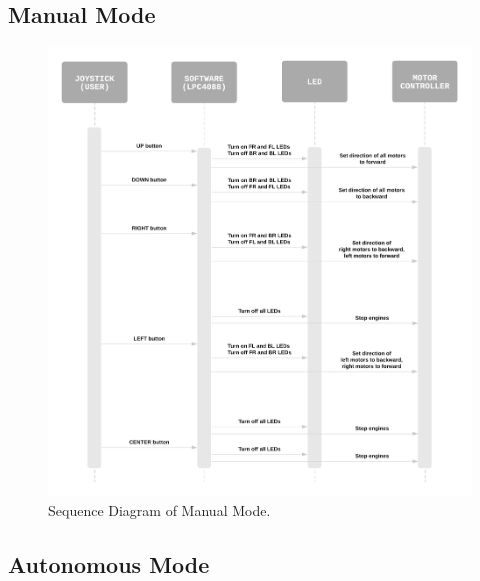 \documentclass[12pt]{article}
\begin{document}
\subsection{Manual Mode}
\FloatBarrier
\begin{figure}[htbp]
\begin{center}
\includegraphics[width=1\columnwidth]{figures/sequence-diagram1.png}
\end{center}
\caption{Sequence Diagram of Manual Mode.}
\label{fig:sample}
\end{figure}

\newpage

\subsection{Autonomous Mode}
\end{document}
